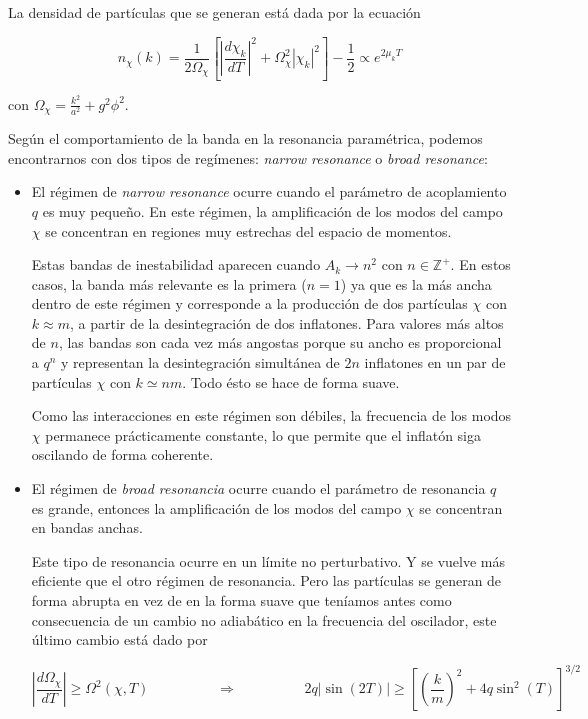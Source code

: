 La densidad de partículas que se generan está dada por la ecuación

\begin{equation}
    n_\chi (k) = \frac{1}{2 \Omega_\chi} \left[ \left| \frac{d \chi_k}{d T} \right|^2 + \Omega_\chi^2 |\chi_k|^2  \right] - \frac{1}{2} \propto e^{2 \mu_k T} 
\end{equation}

\noindent
con $\displaystyle \Omega_\chi = \frac{k^2}{a^2} + g^2 \phi^2$.

Según el comportamiento de la banda en la resonancia paramétrica, podemos encontrarnos con dos tipos de regímenes: \textit{narrow resonance} o \textit{broad resonance}:

\begin{itemize}
    \item El régimen de \textit{narrow resonance} ocurre cuando el parámetro de acoplamiento $q$ es muy pequeño. En este régimen, la amplificación de los modos del campo $\chi$ se concentran en regiones muy estrechas del espacio de momentos. 
    
    Estas bandas de inestabilidad aparecen cuando $A_k \rightarrow n^2$ con $n \in \mathbb{Z}^+$. En estos casos, la banda más relevante es la primera ($n = 1$) ya que es la más ancha dentro de este régimen y corresponde a la producción de dos partículas $\chi$ con $k \approx m$, a partir de la desintegración de dos inflatones. Para valores más altos de $n$, las bandas son cada vez más angostas porque su ancho es proporcional a $q^n$ y representan la desintegración simultánea de $2 n$ inflatones en un par de partículas $\chi$ con $k \simeq n m$. Todo ésto se hace de forma suave. 
    
    Como las interacciones en este régimen son débiles, la frecuencia de los modos $\chi$ permanece prácticamente constante, lo que permite que el inflatón siga oscilando de forma coherente.

    \item El régimen de \textit{broad resonancia} ocurre cuando el parámetro de resonancia $q$ es grande, entonces la amplificación de los modos del campo $\chi$ se concentran en bandas anchas.

    Este tipo de resonancia ocurre en un límite no perturbativo. Y se vuelve más eficiente que el otro régimen de resonancia. Pero las partículas se generan de forma abrupta en vez de en la forma suave que teníamos antes como consecuencia de un cambio no adiabático en la frecuencia del oscilador, este último cambio está dado por

    \begin{equation}
        \left| \frac{d \Omega_\chi}{dT} \right| \geq \Omega^2 (\chi, T) \hspace{2cm} \Longrightarrow \hspace{2cm}  2q |\sin (2T)| \geq \left[ \left( \frac{k}{m} \right)^2 + 4q \sin^2 (T) \right]^{3/2}
    \end{equation}
\end{itemize}

